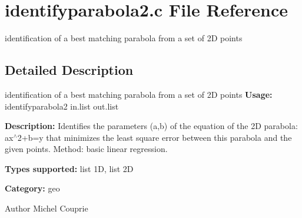 \section{identifyparabola2.c File Reference}
\label{identifyparabola2_8c}


identification of a best matching parabola from a set of 2D points  




\subsection{Detailed Description}
identification of a best matching parabola from a set of 2D points {\bfseries Usage:} identifyparabola2 in.list out.list

{\bfseries Description:} Identifies the parameters (a,b) of the equation of the 2D parabola: ax$^\wedge$2+b=y that minimizes the least square error between this parabola and the given points. Method: basic linear regression.

{\bfseries Types supported:} list 1D, list 2D

{\bfseries Category:} geo

\begin{DoxyAuthor}{Author}
Michel Couprie 
\end{DoxyAuthor}
